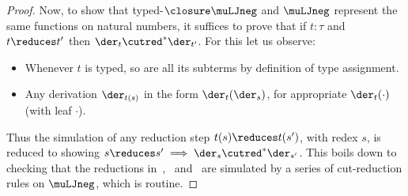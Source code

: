 \begin{proof}
Now, to show that  typed-$\closure \muLJneg$  and $\muLJneg$ represent the same functions on natural numbers, it suffices to prove that if $ t: \tau$  and $t \reduces t'$ then $\der_{t}\cutred^* \der_{t'}$.
% 
For this let us observe:
\begin{itemize}
    \item Whenever $t$ is typed, so are all its subterms by definition of type assignment.
    \item Any derivation $\der_{t(s)}$ in the form $\der_t(\der_s)$, for appropriate $\der_t(\cdot)$ (with leaf $\cdot$).
\end{itemize}
Thus the simulation of any reduction step $t(s) \reduces t(s')$, with redex $s$, is reduced to showing $s\reduces s' \implies \der_s \cutred^* \der_{s'}$.
% 
This boils down to checking that the reductions in~,~ and~ are simulated by a series of cut-reduction rules on $\muLJneg$, which  is routine. 
% 

\end{proof}
